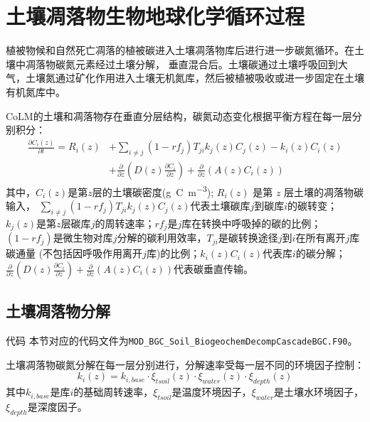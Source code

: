 \chapter{土壤凋落物生物地球化学循环过程}\label{土壤凋落物生物地球化学循环过程}

植被物候和自然死亡凋落的植被碳进入土壤凋落物库后进行进一步碳氮循环。在土壤中凋落物碳氮元素经过土壤分解，
垂直混合后。土壤碳通过土壤呼吸回到大气，土壤氮通过矿化作用进入土壤无机氮库，然后被植被吸收或进一步固定在土壤有机氮库中。

CoLM的土壤和凋落物存在垂直分层结构，碳氮动态变化根据平衡方程在每一层分别积分：
\begin{equation}
\begin{aligned}
\frac{\partial C_{i}(z)}{\partial t}=R_{i}(z) &+\sum_{i \neq j}\left(1-r f_{j}\right) T_{j i} k_{j}(z) C_{j}(z)-k_{i}(z) C_{i}(z) \\
&+\frac{\partial}{\partial z}\left(D(z) \frac{\partial C_{i}}{\partial z}\right)+\frac{\partial}{\partial z}\left(A(z) C_{i}(z)\right)
\end{aligned}
\end{equation}
其中，$C_i\left(z\right)$是第$z$层的土壤碳密度(\unit{g.C.m^{-3}}); $R_i (z)$ 是第 $z$ 层土壤的凋落物碳输入，
$\sum_{i\neq j}{\left(1-{rf}_j\right)T_{ji}k_j\left(z\right)C_j\left(z\right)}$代表土壤碳库$j$到碳库$i$的碳转变；
$k_j\left(z\right)$是第$z$层碳库$j$的周转速率；${rf}_j$是$j$库在转换中呼吸掉的碳的比例；
$\left(1-{rf}_j\right)$是微生物对库$j$分解的碳利用效率，$T_{ji}$是碳转换途径$j$到$i$在所有离开$j$库碳通量
(不包括因呼吸作用离开$j$库)的比例；$k_i\left(z\right)C_i\left(z\right)$代表库$i$的碳分解；
$\frac{\partial}{\partial z}\left(D\left(z\right)\frac{\partial C_i}{\partial z}\right)+\frac{\partial}{\partial z}\left(A\left(z\right)C_i\left(z\right)\right)$代表碳垂直传输。


\section{土壤凋落物分解}\label{土壤凋落物分解}

\begin{mymdframed}{代码}
本节对应的代码文件为\texttt{MOD\_BGC\_Soil\_BiogeochemDecompCascadeBGC.F90}。
\end{mymdframed}

土壤凋落物碳氮分解在每一层分别进行，分解速率受每一层不同的环境因子控制：
\begin{equation}
k_{i}(z)=k_{i,base} \cdot \xi_{tsoil}(z) \cdot \xi_{water}(z) \cdot \xi_{depth}(z)
\end{equation}
其中$k_{i,base}$是库$i$的基础周转速率，$\xi_{tsoil}$是温度环境因子，$\xi_{water}$是土壤水环境因子，$\xi_{depth}$是深度因子。


